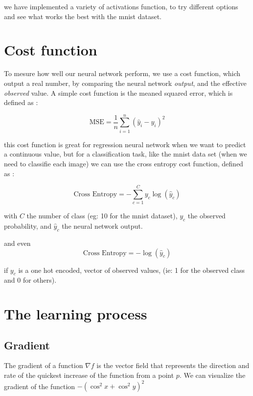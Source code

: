 \documentclass[a4paper, twocolumn, twoside]{article}
\begin{document}
	we have implemented a variety of activations function, to try different options and see what works the best with the mnist dataset.

	\section{Cost function}
	To mesure how well our neural network perform, we use a cost function, which output a real number,
	by comparing the neural network \textit{output}, and the effective \textit{observed} value.
	A simple cost function is the meaned squared error, which is defined as : 

	$$
	\text{MSE} = \frac{1}{n} \sum_{i=1}^{n} (\hat{y}_i - y_i)^2
	$$

	this cost function is great for regression neural network when we want to predict a continuous value, but for a classification task,
	like the mnist data set (when we need to classifie each image)
	we can use the cross entropy cost function, defined as :

	$$
		\text{Cross Entropy} = -\sum_{c=1}^{C} y_{c} \log(\hat{y}_{c})
	$$

	with $C$ the number of class (eg: 10 for the mnist dataset), $y_{c}$ the observed probability, and $\hat{y}_{c}$ the neural network output.

	and even
	$$
		\text{Cross Entropy} = -\log(\hat{y}_{c})
	$$

	if $y_{c}$ is a one hot encoded, vector of observed values, (ie: 1 for the observed class and 0 for others).

	\section{The learning process}
	\subsection{Gradient}
	The gradient of a function $\nabla f$ is the vector field that represents the direction
	and rate of the quickest increase of the function from a point $p$.
	We can visualize the gradient of the function $-(\cos^2 x  +\cos^2 y)^2$
\end{document}
